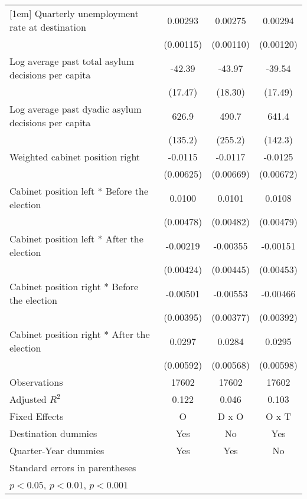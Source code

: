 \begin{table}[htbp]
\begin{tabular}{l*{3}{c}}
[1em]
Quarterly unemployment rate at destination&     0.00293\sym{*}  &     0.00275\sym{*}  &     0.00294\sym{*}  \\
                    &   (0.00115)         &   (0.00110)         &   (0.00120)         \\
[1em]
Log average past total asylum decisions per capita&      -42.39\sym{*}  &      -43.97\sym{*}  &      -39.54\sym{*}  \\
                    &     (17.47)         &     (18.30)         &     (17.49)         \\
[1em]
Log average past dyadic asylum decisions per capita&       626.9\sym{***}&       490.7         &       641.4\sym{***}\\
                    &     (135.2)         &     (255.2)         &     (142.3)         \\
[1em]
Weighted cabinet position right&     -0.0115         &     -0.0117         &     -0.0125         \\
                    &   (0.00625)         &   (0.00669)         &   (0.00672)         \\
[1em]
Cabinet position left * Before the election&      0.0100\sym{*}  &      0.0101\sym{*}  &      0.0108\sym{*}  \\
                    &   (0.00478)         &   (0.00482)         &   (0.00479)         \\
[1em]
Cabinet position left * After the election&    -0.00219         &    -0.00355         &    -0.00151         \\
                    &   (0.00424)         &   (0.00445)         &   (0.00453)         \\
[1em]
Cabinet position right * Before the election&    -0.00501         &    -0.00553         &    -0.00466         \\
                    &   (0.00395)         &   (0.00377)         &   (0.00392)         \\
[1em]
Cabinet position right * After the election&      0.0297\sym{***}&      0.0284\sym{***}&      0.0295\sym{***}\\
                    &   (0.00592)         &   (0.00568)         &   (0.00598)         \\
\hline
Observations        &       17602         &       17602         &       17602         \\
Adjusted \(R^{2}\)  &       0.122         &       0.046         &       0.103         \\
Fixed Effects       &           O         &       D x O         &       O x T         \\
Destination dummies &         Yes         &          No         &         Yes         \\
Quarter-Year dummies&         Yes         &         Yes         &          No         \\
\hline\hline
\multicolumn{4}{l}{\footnotesize Standard errors in parentheses}\\
\multicolumn{4}{l}{\footnotesize \sym{*} \(p<0.05\), \sym{**} \(p<0.01\), \sym{***} \(p<0.001\)}\\
\end{tabular}
\end{table}
